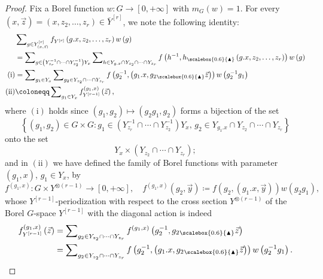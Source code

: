 \documentclass{amsart}
\numberwithin{equation}{subsection}
\theoremstyle{remark}
\newcommand{\diag}{\textsubscript{\raisebox{0.4ex}{\scalebox{0.6}{\(\blacktriangle\)}}}}\xspace
\begin{document}
\begin{proof}
Fix a Borel function \(w:G\to\left[0,+\infty\right]\) with \(m_{G}\left(w\right)=1\). For every \(\left(x,\vec{z}\right)=\left(x,z_{2},\dotsc,z_{r}\right)\in\overline{Y}^{\left[r\right]}\), we note the following identity:
\begin{equation}\label{eq:mididen}
\begin{aligned}
&\sum\nolimits_{g\in Y_{\left(x,\vec{z}\right)}^{\left[r\right]}}f_{Y^{\left[r\right]}}\left(g.x,z_{2},\dotsc,z_{r}\right)w\left(g\right)\\
&=\sum\nolimits_{g\in\left(Y_{z_{r}}^{-1}\cap\dotsm\cap Y_{z_{2}}^{-1}\right)Y_{x}}\sum\nolimits_{h\in Y_{g.x}\cap Y_{z_{2}}\cap\dotsm\cap Y_{z_{r}}}f\left(h^{-1},h\diag\left(g.x,z_{2},\dotsc,z_{r}\right)\right)w\left(g\right)\\
\left(\mathrm{i}\right)&=\sum\nolimits_{g_{1}\in Y_{x}}\sum\nolimits_{g_{2}\in Y_{z_{2}}\cap\dotsm\cap Y_{z_{r}}}f\left(g_{2}^{-1},\left(g_{1}.x,g_{2}\diag\vec{z}\right)\right)w\left(g_{2}^{-1}g_{1}\right)\\
\left(\mathrm{ii}\right)&\coloneqq\sum\nolimits_{g_{1}\in Y_{x}}f_{Y^{\left[r-1\right]}}^{\left(g_{1},x\right)}\left(\vec{z}\right),
\end{aligned}
\end{equation}
where \(\left(\mathrm{i}\right)\) holds since \(\left(g_{1},g_{2}\right)\mapsto\left(g_{2}g_{1},g_{2}\right)\) forms a bijection of the set
\[\left\{\left(g_{1},g_{2}\right)\in G\times G:g_{1}\in\left(Y_{z_{r}}^{-1}\cap\dotsm\cap Y_{z_{2}}^{-1}\right)Y_{x},\,g_{2}\in Y_{g_{1}.x}\cap Y_{z_{2}}\cap\dotsm\cap Y_{z_{r}}\right\}\]
onto the set
\[Y_{x}\times\left(Y_{z_{2}}\cap\dotsm\cap Y_{z_{r}}\right);\]
and in \(\left(\mathrm{ii}\right)\) we have defined the family of Borel functions with parameter \(\left(g_{1},x\right)\), \(g_{1}\in Y_{x}\), by
\[f^{\left(g_{1},x\right)}:G\times Y^{\otimes\left(r-1\right)}\longrightarrow\left[0,+\infty\right],\quad f^{\left(g_{1},x\right)}\left(g_{2},\vec{y}\right)\coloneqq f\left(g_{2},\left(g_{1}.x,\vec{y}\right)\right)w\left(g_{2}g_{1}\right),\]
whose \(Y^{\left[r-1\right]}\)-periodization with respect to the cross section \(Y^{\otimes\left(r-1\right)}\) of the Borel \(G\)-space \(Y^{\left[r-1\right]}\) with the diagonal action is indeed
\begin{align*}
f_{Y^{\left[r-1\right]}}^{\left(g_{1},x\right)}\left(\vec{z}\right)	
&=\sum\nolimits_{g_{2}\in Y_{z_{2}}\cap\dotsm\cap Y_{z_{r}}}f^{\left(g_{1},x\right)}\left(g_{2}^{-1},g_{2}\diag\vec{z}\right)\\
&=\sum\nolimits_{g_{2}\in Y_{z_{2}}\cap\dotsm\cap Y_{z_{r}}}f\left(g_{2}^{-1},\left(g_{1}.x,g_{2}\diag\vec{z}\right)\right)w\left(g_{2}^{-1}g_{1}\right).

\end{align*}
\end{proof}
\end{document}
